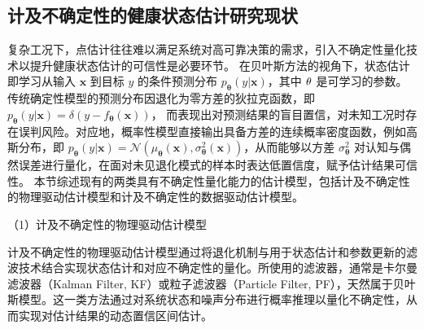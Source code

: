 \subsection{计及不确定性的健康状态估计研究现状}\label{subsec:SOH_estimation}


复杂工况下，点估计往往难以满足系统对高可靠决策的需求，引入不确定性量化技术以提升健康状态估计的可信性是必要环节。
% 
在贝叶斯方法的视角下，状态估计即学习从输入 $\boldsymbol{x}$ 到目标 $y$ 的条件预测分布 $p_{\boldsymbol{\theta}}(y|\boldsymbol{x})$，其中 $\boldmath{\theta}$ 是可学习的参数。传统确定性模型的预测分布因退化为零方差的狄拉克函数，即 $p_{\boldsymbol{\theta}}(y|\boldsymbol{x}) = \delta(y - f_{\boldsymbol{\theta}}(\boldsymbol{x}))$， 而表现出对预测结果的盲目置信，对未知工况时存在误判风险。对应地，概率性模型直接输出具备方差的连续概率密度函数，例如高斯分布，即 $p_{\boldsymbol{\theta}}(y|\boldsymbol{x}) = \mathcal{N}(\mu_{\boldsymbol{\theta}}(\boldsymbol{x}), \sigma^2_{\boldsymbol{\theta}}(\boldsymbol{x}))$，从而能够以方差 $\sigma^2_{\boldsymbol{\theta}}$ 对认知与偶然误差进行量化，在面对未见退化模式的样本时表达低置信度，赋予估计结果可信性。
%
本节综述现有的两类具有不确定性量化能力的估计模型，包括计及不确定性的物理驱动估计模型和计及不确定性的数据驱动估计模型。

（1）计及不确定性的物理驱动估计模型 %

计及不确定性的物理驱动估计模型通过将退化机制与用于状态估计和参数更新的滤波技术结合实现状态估计和对应不确定性的量化。所使用的滤波器，通常是卡尔曼滤波器（Kalman Filter, KF）或粒子滤波器（Particle Filter, PF），天然属于贝叶斯模型。这一类方法通过对系统状态和噪声分布进行概率推理以量化不确定性\cite{chen2003bayesian}，从而实现对估计结果的动态置信区间估计。

